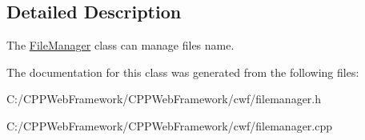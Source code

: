 \subsection{Detailed Description}
The \mbox{\hyperlink{class_file_manager}{File\+Manager}} class can manage file\textquotesingle{}s name. 

The documentation for this class was generated from the following files\+:\begin{DoxyCompactItemize}
\item 
C\+:/\+C\+P\+P\+Web\+Framework/\+C\+P\+P\+Web\+Framework/cwf/filemanager.\+h\item 
C\+:/\+C\+P\+P\+Web\+Framework/\+C\+P\+P\+Web\+Framework/cwf/filemanager.\+cpp\end{DoxyCompactItemize}
